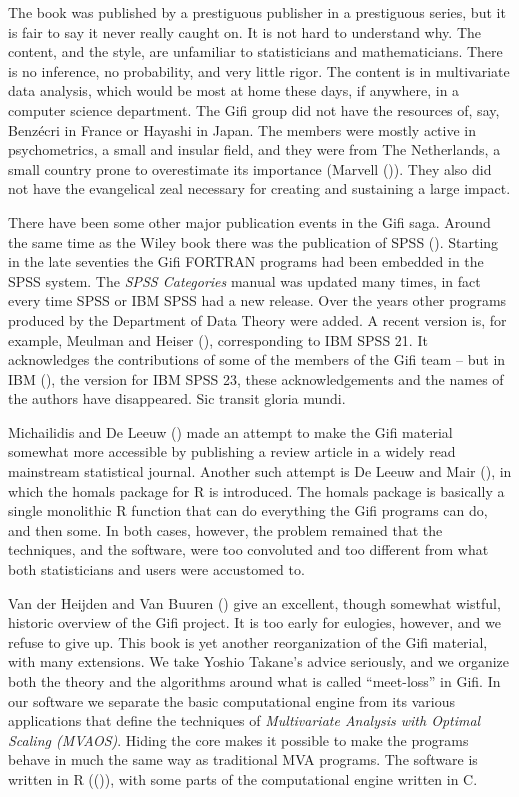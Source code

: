 \documentclass[
  12pt,
  letterpaper,
  DIV=11,
  numbers=noendperiod]{scrreprt}
\begin{document}
The book was published by a prestiguous publisher in a prestiguous
series, but it is fair to say it never really caught on. It is not hard
to understand why. The content, and the style, are unfamiliar to
statisticians and mathematicians. There is no inference, no probability,
and very little rigor. The content is in multivariate data analysis,
which would be most at home these days, if anywhere, in a computer
science department. The Gifi group did not have the resources of, say,
Benzécri in France or Hayashi in Japan. The members were mostly active
in psychometrics, a small and insular field, and they were from The
Netherlands, a small country prone to overestimate its importance
(Marvell ()). They also did not have the
evangelical zeal necessary for creating and sustaining a large impact.

There have been some other major publication events in the Gifi saga.
Around the same time as the Wiley book there was the publication of SPSS
(). Starting in the late seventies the Gifi
FORTRAN programs had been embedded in the SPSS system. The \emph{SPSS
Categories} manual was updated many times, in fact every time SPSS or
IBM SPSS had a new release. Over the years other programs produced by
the Department of Data Theory were added. A recent version is, for
example, Meulman and Heiser (),
corresponding to IBM SPSS 21. It acknowledges the contributions of some
of the members of the Gifi team -- but in IBM
(), the version for IBM SPSS 23, these
acknowledgements and the names of the authors have disappeared. Sic
transit gloria mundi.

Michailidis and De Leeuw ()
made an attempt to make the Gifi material somewhat more accessible by
publishing a review article in a widely read mainstream statistical
journal. Another such attempt is De Leeuw and Mair
(), in which the homals package
for R is introduced. The homals package is basically a single monolithic
R function that can do everything the Gifi programs can do, and then
some. In both cases, however, the problem remained that the techniques,
and the software, were too convoluted and too different from what both
statisticians and users were accustomed to.

Van der Heijden and Van Buuren
() give an excellent,
though somewhat wistful, historic overview of the Gifi project. It is
too early for eulogies, however, and we refuse to give up. This book is
yet another reorganization of the Gifi material, with many extensions.
We take Yoshio Takane's advice seriously, and we organize both the
theory and the algorithms around what is called ``meet-loss'' in Gifi.
In our software we separate the basic computational engine from its
various applications that define the techniques of \emph{Multivariate
Analysis with Optimal Scaling (MVAOS)}. Hiding the core makes it
possible to make the programs behave in much the same way as traditional
MVA programs. The software is written in R
(()), with
some parts of the computational engine written in C.
\end{document}
